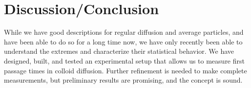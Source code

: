 \section{Discussion/Conclusion}
While we have good descriptions for regular diffusion and average particles, and have been able to do so for a long time now, we have only recently been able to understand the extremes and characterize their statistical behavior. We have designed, built, and tested an experimental setup that allows us to measure first passage times in colloid diffusion. Further refinement is needed to make complete measurements, but preliminary results are promising, and the concept is sound.



%
%

